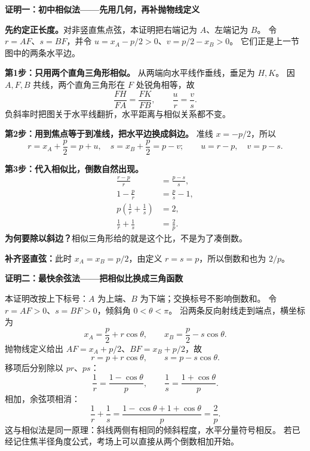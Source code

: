 \clearpage
\begin{proofbox}
\textbf{\textcolor{CProof}{证明一：初中相似法——先用几何，再补抛物线定义}}

\textbf{先约定正长度。}对非竖直焦点弦，本证明把右端记为 $A$、左端记为 $B$。
令 $r=AF$、$s=BF$，并令 $u=x_A-p/2>0$、$v=p/2-x_B>0$。
它们正是上一节图中的两条水平边。

\par\medskip
\textbf{第1步：只用两个直角三角形相似。}
从两端向水平线作垂线，垂足为 $H,K$。
因 $A,F,B$ 共线，两个直角三角形在 $F$ 处锐角相等，故
\[
 \boxed{\frac{FH}{FA}=\frac{FK}{FB}},\qquad \frac ur=\frac vs.
\]
负斜率时把图关于水平线翻折，水平距离与相似关系都不变。

\par\medskip
\textbf{第2步：用到焦点等于到准线，把水平边换成斜边。}
准线 $x=-p/2$，所以
\[
 r=x_A+\frac p2=p+u,\quad
 s=x_B+\frac p2=p-v;
 \qquad u=r-p,\quad v=p-s.
\]

\par\medskip
\textbf{第3步：代入相似比，倒数自然出现。}
\[
\begin{aligned}
 \frac{r-p}{r}&=\frac{p-s}{s},\\
 1-\frac pr&=\frac ps-1,\\
 p\left(\frac1r+\frac1s\right)&=2,\\
 \boxed{\frac1r+\frac1s}&=\boxed{\frac2p}.
\end{aligned}
\]
\textbf{为何要除以斜边？}相似三角形给的就是这个比，不是为了凑倒数。

\par\medskip
\textbf{补齐竖直弦：}此时 $x_A=x_B=p/2$，由定义 $r=s=p$，所以倒数和也为 $2/p$。
\end{proofbox}

\clearpage
\begin{proofbox}
\textbf{\textcolor{CProof}{证明二：最快余弦法——把相似比换成三角函数}}

本证明改按上下标号：$A$ 为上端、$B$ 为下端；交换标号不影响倒数和。
令 $r=AF>0$、$s=BF>0$，倾斜角 $0<\theta<\pi$。
沿两条反向射线走到端点，横坐标为
\[
 x_A=\frac p2+r\cos\theta,\qquad
 x_B=\frac p2-s\cos\theta.
\]
抛物线定义给出 $AF=x_A+p/2$、$BF=x_B+p/2$，故
\[
 r=p+r\cos\theta,\qquad s=p-s\cos\theta.
\]
移项后分别除以 $pr$、$ps$：
\[
 \frac1r=\frac{1-\cos\theta}{p},\qquad
 \frac1s=\frac{1+\cos\theta}{p}.
\]
相加，余弦项相消：
\[
 \boxed{\frac1r+\frac1s}
 =\frac{1-\cos\theta+1+\cos\theta}{p}
 =\boxed{\frac2p}.
\]
这与相似法是同一原理：斜线两侧有相同的倾斜程度，水平分量符号相反。
若已经记住焦半径角度公式，考场上可以直接从两个倒数相加开始。
\end{proofbox}

